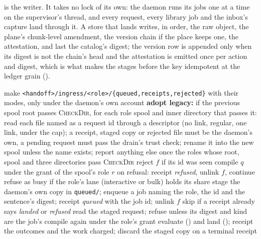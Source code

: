 \documentclass[11pt]{article}
\theoremstyle{plain}
\theoremstyle{definition}
\theoremstyle{remark}
\newcommand{\code}[1]{\texttt{#1}}
\begin{document}
 is the writer. It takes no lock of its own: the daemon runs its jobs one at a
time on the supervisor's thread, and every request, every library job and the inbox's capture
land through it. A store that lands writes, in order, the raw object, the plane's chunk-level
amendment, the version chain if the place keeps one, the attestation, and last the catalog's
digest; the version row is appended only when its digest is not the chain's head and the
attestation is emitted once per action and digest, which is what makes the stages before the
key idempotent at the ledger grain ().

\begin{algorithm}[t]
\caption{The drain, the handler and the legacy takeover (\code{scheduler/ingress.py}, \code{core/ingest/ingress.py}).}
\label{alg:drain}
\footnotesize
\begin{algorithmic}[1]
  \State make \code{<handoff>/ingress/<role>/\{queued,receipts,rejected\}} with their modes, only under the daemon's own account
  \State \textbf{adopt legacy:} if the previous spool root passes \textsc{CheckDir}, for each role spool and inner directory that passes it: read each file named as a request id through a descriptor (no link, regular, one link, under the cap); a receipt, staged copy or rejected file must be the daemon's own, a pending request must pass the drain's trust check; rename it into the new spool unless the name exists; report anything else once
  \State \Return the roles whose root, spool and three directories pass \textsc{CheckDir}
\EndProcedure
{}
    \State reject $f$ if its id was seen
    \State compile $q$ under the grant of the spool's role $r$ 
    \State on refusal: receipt \emph{refused}, unlink $f$, continue
    \State refuse as busy if the role's lane (interactive or bulk) holds its share
    \State stage the daemon's own copy in \code{queued/}; enqueue a job naming the role, the id and the sentence's digest; receipt \emph{queued} with the job id; unlink $f$
  \EndFor
\EndProcedure
{}
  \State skip if a receipt already says \emph{landed} or \emph{refused}
  \State read the staged request; refuse unless its digest and kind are the job's
  \State compile again under the role's grant 
  \State evaluate () and land (); receipt the outcomes and the work charged; discard the staged copy on a terminal receipt
\EndProcedure
\end{algorithmic}
\end{algorithm}
\end{document}

